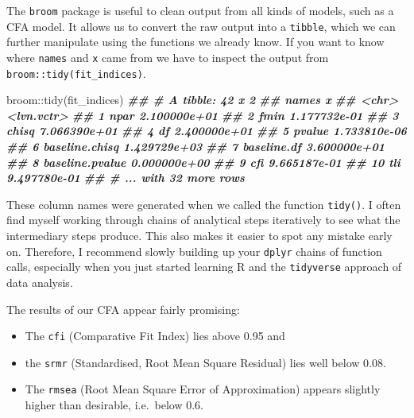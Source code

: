 \documentclass[
]{book}
\newenvironment{Shaded}{\begin{snugshade}}{\end{snugshade}}
\newcommand{\DocumentationTok}[1]{\textcolor[rgb]{0.56,0.35,0.01}{\textbf{\textit{#1}}}}
\newcommand{\FunctionTok}[1]{\textcolor[rgb]{0.00,0.00,0.00}{#1}}
\newcommand{\NormalTok}[1]{#1}
\newcommand{\SpecialCharTok}[1]{\textcolor[rgb]{0.00,0.00,0.00}{#1}}
\begin{document}
The \texttt{broom} package is useful to clean output from all kinds of models, such as a CFA model. It allows us to convert the raw output into a \texttt{tibble}, which we can further manipulate using the functions we already know. If you want to know where \texttt{names} and \texttt{x} came from we have to inspect the output from \texttt{broom::tidy(fit\_indices)}.

\begin{Shaded}
\begin{Highlighting}[]
\NormalTok{broom}\SpecialCharTok{::}\FunctionTok{tidy}\NormalTok{(fit\_indices)}
\DocumentationTok{\#\# \# A tibble: 42 x 2}
\DocumentationTok{\#\#    names           x           }
\DocumentationTok{\#\#    \textless{}chr\textgreater{}           \textless{}lvn.vctr\textgreater{}  }
\DocumentationTok{\#\#  1 npar            2.100000e+01}
\DocumentationTok{\#\#  2 fmin            1.177732e{-}01}
\DocumentationTok{\#\#  3 chisq           7.066390e+01}
\DocumentationTok{\#\#  4 df              2.400000e+01}
\DocumentationTok{\#\#  5 pvalue          1.733810e{-}06}
\DocumentationTok{\#\#  6 baseline.chisq  1.429729e+03}
\DocumentationTok{\#\#  7 baseline.df     3.600000e+01}
\DocumentationTok{\#\#  8 baseline.pvalue 0.000000e+00}
\DocumentationTok{\#\#  9 cfi             9.665187e{-}01}
\DocumentationTok{\#\# 10 tli             9.497780e{-}01}
\DocumentationTok{\#\# \# ... with 32 more rows}
\end{Highlighting}
\end{Shaded}

These column names were generated when we called the function \texttt{tidy()}. I often find myself working through chains of analytical steps iteratively to see what the intermediary steps produce. This also makes it easier to spot any mistake early on. Therefore, I recommend slowly building up your \texttt{dplyr} chains of function calls, especially when you just started learning R and the \texttt{tidyverse} approach of data analysis.

The results of our CFA appear fairly promising:

\begin{itemize}
\item
  The \texttt{cfi} (Comparative Fit Index) lies above 0.95 and
\item
  the \texttt{srmr} (Standardised, Root Mean Square Residual) lies well below 0.08.
\item
  The \texttt{rmsea} (Root Mean Square Error of Approximation) appears slightly higher than desirable, i.e.~below 0.6. \citep{hu-bentler-1999cutoff}
\end{itemize}
\end{document}
